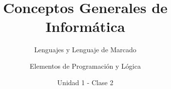 \documentclass[usenames,dvipsnames]{../../common/beamerUNQ}
\title{Conceptos Generales de Informática}
\subtitle{Lenguajes y Lenguaje de Marcado}
\author{Elementos de Programación y Lógica}
\date{Unidad 1 - Clase 2}
\begin{document}
  \titleframe
  \toc
  
  
  \finaltitleframe
\end{document}
